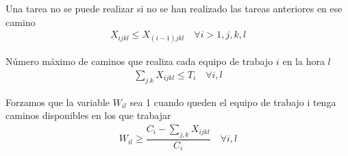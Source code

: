 Una tarea no se puede realizar si no se han realizado las tareas anteriores en ese camino
\[\begin{aligned}
X_{ijkl} \leq X_{(i-1)jkl} \quad \forall i>1,j,k,l
\end{aligned}\]

Número máximo de caminos que realiza cada equipo de trabajo $i$ en la hora $l$
\[\begin{aligned}
\sum_{j.k} X_{ijkl} \leq T_i \quad \forall i,l
\end{aligned}\]

Forzamos que la variable $W_{il}$ sea 1 cuando queden el equipo de trabajo i tenga caminos disponibles en los que trabajar
\[\begin{aligned}
W_{il} \geq \dfrac{C_i-\sum_{j,k} X_{ijkl}}{C_i}  \quad \forall i,l
\end{aligned}\]
